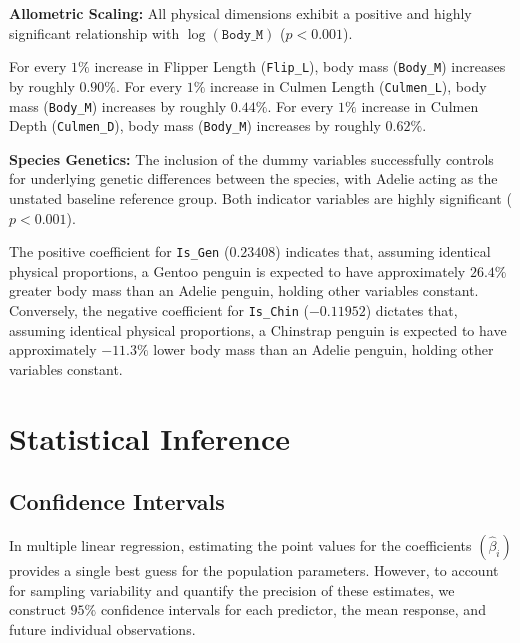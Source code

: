 \documentclass[12pt]{article}
\begin{document}
\begin{itemize}
    \ii \textbf{Allometric Scaling:} All physical dimensions exhibit
    a positive and highly significant relationship with
    $\log(\texttt{Body\_M})$ ($p < 0.001$).
    \begin{itemize}
        \ii For every $1\%$ increase in Flipper Length (\texttt{Flip\_L}),
        body mass (\texttt{Body\_M}) increases by roughly $0.90\%$.
        \ii For every $1\%$ increase in Culmen Length (\texttt{Culmen\_L}),
        body mass (\texttt{Body\_M}) increases by roughly $0.44\%$.
        \ii For every $1\%$ increase in Culmen Depth (\texttt{Culmen\_D}),
        body mass (\texttt{Body\_M}) increases by roughly $0.62\%$.
    \end{itemize}
    \ii \textbf{Species Genetics:} The inclusion of the
    dummy variables successfully controls for
    underlying genetic differences between the species,
    with Adelie acting as the unstated baseline reference group.
    Both indicator variables are highly significant ($p < 0.001$).
    \begin{itemize}
        \ii The positive coefficient for \texttt{Is\_Gen} ($0.23408$)
        indicates that, assuming identical physical proportions,
        a Gentoo penguin is expected to have approximately
        $26.4\%$
        greater body mass than an Adelie penguin,
        holding other variables constant.
        \ii Conversely, the negative coefficient for
        \texttt{Is\_Chin} ($-0.11952$) dictates that,
        assuming identical physical proportions,
        a Chinstrap penguin is expected to have approximately
        $-11.3\%$
        lower body mass than an Adelie penguin,
        holding other variables constant.
    \end{itemize}
\end{itemize}

\section{Statistical Inference}

\subsection{Confidence Intervals}

In multiple linear regression,
estimating the point values for the coefficients
$(\hat{\beta}_i)$ provides a single best guess for the
population parameters. However,
to account for sampling variability and quantify the
precision of these estimates, we construct $95\%$
confidence intervals for each predictor, the mean response,
and future individual observations.
\end{document}
